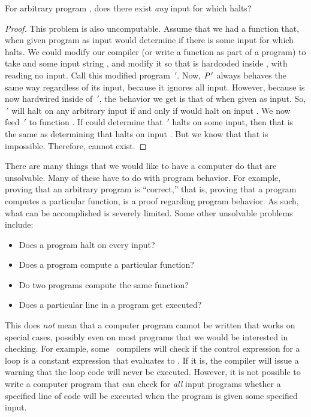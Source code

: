 \begin{example}
For arbitrary program , does there exist \emph{any} input for
which  halts?

\begin{proof}
This problem is also uncomputable.
Assume that we had a function  that, when given program
 as input would determine if there is some input for which
 halts.
We could modify our compiler (or write a function as part of a
program) to take  and some input string , and modify
it so that  is hardcoded inside , with 
reading no input.
Call this modified program \,\('\).
Now, \({\textit{P}}\,'\) always behaves the same way regardless of its
input, because it ignores all input.
However, because  is now hardwired inside of \,\('\),
the behavior we get is that of  when given  as input.
So, \,\('\) will halt on any arbitrary input if and only if
 would halt on input .
We now feed \,\('\) to function .
If  could determine that \,\('\) halts on some
input, then that is the same as determining that  halts on
input .
But we know that that is impossible.
Therefore,  cannot exist.
\end{proof}
\end{example}

There are many things that we would like to have a computer do
that are unsolvable.
Many of these have to do with program behavior.
For example, proving that an arbitrary program is ``correct,'' that
is, proving that a program computes a particular function, is a proof
regarding program behavior.
As such, what can be accomplished is severely limited.
Some other unsolvable problems include:
\begin{itemize}
\item Does a program halt on every input?
\item Does a program compute a particular function?
\item Do two programs compute the same function?
\item Does a particular line in a program get executed?
\end{itemize}

This does \emph{not} mean that a computer program cannot be written
that works on special cases, possibly even on most programs that we
would be interested in checking.
For example, some \C\ compilers will check if the control expression
for a  loop is a constant expression that evaluates to
\FALSE.
If it is, the compiler will issue a warning that the 
loop code will never be executed.
However, it is not possible to write a computer program that can
check for \emph{all} input programs whether a specified line of code
will be executed when the program is given some specified input.

